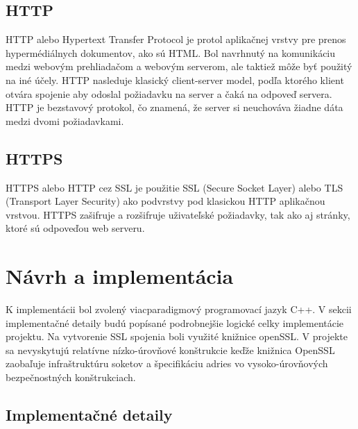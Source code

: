 \documentclass[11pt,a4paper]{article}
\begin{document}
	\subsection{HTTP}
		\indent HTTP alebo Hypertext Transfer Protocol je 
		protol aplikačnej vrstvy pre prenos hypermédiálnych 
		dokumentov, ako sú HTML. Bol navrhnutý na komunikáciu medzi webovým prehliadačom a webovým 
		serverom, ale taktiež môže byť použitý na iné účely. HTTP nasleduje klasický client-server model, 
		podľa ktorého klient otvára spojenie aby odoslal požiadavku na server a čaká na odpoveď servera. 
		HTTP je bezstavový protokol, čo znamená, že server si neuchováva žiadne dáta medzi dvomi požiadavkami.

	\subsection{HTTPS}
		\indent HTTPS alebo HTTP cez SSL je použitie SSL (Secure Socket Layer) alebo TLS (Transport Layer Security) 
		ako podvrstvy pod klasickou HTTP aplikačnou vrstvou. HTTPS zašifruje a rozšifruje uživateľské požiadavky, tak 
		ako aj stránky, ktoré sú odpoveďou web serveru.


\section{Návrh a implementácia}

	\indent K implementácii bol zvolený viacparadigmový programovací jazyk C++. V sekcii implementačné detaily 
	budú popísané podrobnejšie logické celky implementácie projektu. Na vytvorenie SSL spojenia boli využité 
	knižnice openSSL. V projekte sa nevyskytujú relatívne nízko-úrovňové konštrukcie keďže knižnica OpenSSL 
	zaobaľuje infraštruktúru soketov a špecifikáciu adries vo vysoko-úrovňových bezpečnostných konštrukciach.

	\subsection{Implementačné detaily}
\end{document}

